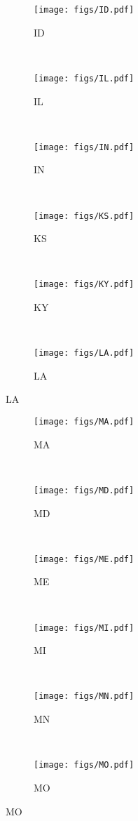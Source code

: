 \begin{figure}[tp]
	 \centering
	 \begin{subfigure}[b]{0.49\textwidth}
	 \centering
	 \texttt{[image: figs/ID.pdf]}
	 \caption{ ID }
	 \end{subfigure}
	 ~
	 \begin{subfigure}[b]{0.49\textwidth}
	 \centering
	 \texttt{[image: figs/IL.pdf]}
	 \caption{ IL }
	 \end{subfigure}
	 ~
	 \begin{subfigure}[b]{0.49\textwidth}
	 \centering
	 \texttt{[image: figs/IN.pdf]}
	 \caption{ IN }
	 \end{subfigure}
	 ~
	 \begin{subfigure}[b]{0.49\textwidth}
	 \centering
	 \texttt{[image: figs/KS.pdf]}
	 \caption{ KS }
	 \end{subfigure}
	 ~
	 \begin{subfigure}[b]{0.49\textwidth}
	 \centering
	 \texttt{[image: figs/KY.pdf]}
	 \caption{ KY }
	 \end{subfigure}
	 ~
	 \begin{subfigure}[b]{0.49\textwidth}
	 \centering
	 \texttt{[image: figs/LA.pdf]}
	 \caption{ LA }
	 \end{subfigure}
\end{figure}
\begin{figure}[tp]
	 \centering
	 \begin{subfigure}[b]{0.49\textwidth}
	 \centering
	 \texttt{[image: figs/MA.pdf]}
	 \caption{ MA }
	 \end{subfigure}
	 ~
	 \begin{subfigure}[b]{0.49\textwidth}
	 \centering
	 \texttt{[image: figs/MD.pdf]}
	 \caption{ MD }
	 \end{subfigure}
	 ~
	 \begin{subfigure}[b]{0.49\textwidth}
	 \centering
	 \texttt{[image: figs/ME.pdf]}
	 \caption{ ME }
	 \end{subfigure}
	 ~
	 \begin{subfigure}[b]{0.49\textwidth}
	 \centering
	 \texttt{[image: figs/MI.pdf]}
	 \caption{ MI }
	 \end{subfigure}
	 ~
	 \begin{subfigure}[b]{0.49\textwidth}
	 \centering
	 \texttt{[image: figs/MN.pdf]}
	 \caption{ MN }
	 \end{subfigure}
	 ~
	 \begin{subfigure}[b]{0.49\textwidth}
	 \centering
	 \texttt{[image: figs/MO.pdf]}
	 \caption{ MO }
	 \end{subfigure}
\end{figure}
